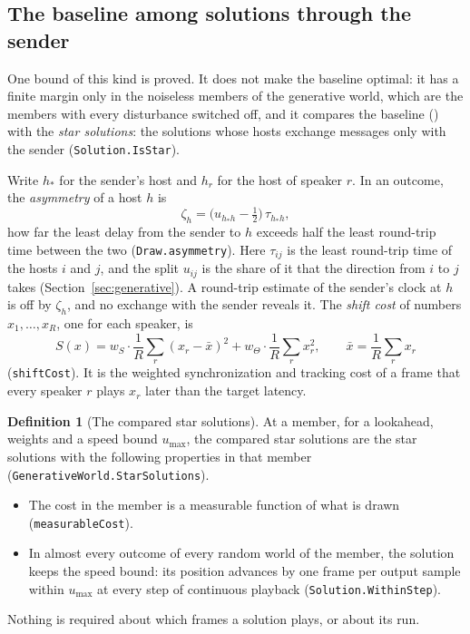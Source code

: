 \documentclass[11pt,a4paper]{article}
\newcommand{\lean}[1]{\texttt{#1}}
\theoremstyle{definition}
\newtheorem{definition}{Definition}[section]
\begin{document}
\subsection{The baseline among solutions through the sender}\label{sec:star-optimal}

One bound of this kind is proved. It does not make the baseline optimal:
it has a finite margin only in the noiseless members of
the generative world, which are the members with every disturbance switched
off, and it compares the baseline
() with the \emph{star solutions}: the
solutions whose hosts exchange messages only with the sender
(\lean{Solution.IsStar}).

Write $h_*$ for the sender's host and $h_r$ for the host of speaker $r$. In
an outcome, the \emph{asymmetry} of a host $h$ is
\[
  \zeta_h = \bigl(u_{h_* h} - \tfrac12\bigr)\,\tau_{h_* h},
\]
how far the least delay from the sender to $h$ exceeds half the least
round-trip time between the two (\lean{Draw.asymmetry}). Here
$\tau_{ij}$ is the least round-trip time of the hosts $i$ and $j$, and the
split $u_{ij}$ is the share of it that the direction from $i$ to $j$ takes
(Section~\ref{sec:generative}). A round-trip
estimate of the sender's clock at $h$ is off by $\zeta_h$, and no exchange
with the sender reveals it. The \emph{shift cost} of numbers
$x_1, \dots, x_R$, one for each speaker, is
\[
  S(x) = w_S \cdot \frac1R \sum_r (x_r - \bar x)^2
       + w_\Theta \cdot \frac1R \sum_r x_r^2,
  \qquad \bar x = \frac1R \sum_r x_r
\]
(\lean{shiftCost}). It is the weighted synchronization and tracking cost of
a frame that every speaker $r$ plays $x_r$ later than the target latency.

\begin{definition}[The compared star solutions]
At a member, for a lookahead, weights and a speed bound $u_{\max}$, the
compared star solutions are the star solutions with the following
properties in that member
(\lean{GenerativeWorld.\allowbreak StarSolutions}).
\begin{itemize}
\item The cost in the member is a measurable function of what is drawn
  (\lean{measurableCost}).
\item In almost every outcome of every random world of the member, the
  solution keeps the speed bound: its position advances by one frame per
  output sample within $u_{\max}$ at every step of continuous playback
  (\lean{Solution.WithinStep}).
\end{itemize}
Nothing is required about which frames a solution plays, or about its run.
\end{definition}
\end{document}
